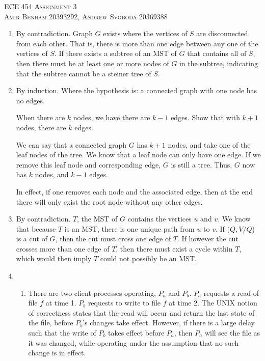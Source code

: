 \documentclass{article}
\begin{document}
\begin{center}
\textsc{\Large ECE 454 Assignment 3}\\[0.5cm]
\textsc{Amir Benham 20393292, Andrew Svoboda 20369388}\\[0.5cm]
\end{center}

\begin{enumerate}

	\item  

By contradiction. Graph \(G\) exists where the vertices of \(S\) are disconnected from each other. That is, there is more than one edge between any one of the vertices of \(S\). If there exists a subtree of an MST of \(G\) that contains all of \(S\), then there must be at least one or more nodes of \(G\) in the subtree, indicating that the subtree cannot be a steiner tree of \(S\).

	\item 
	By induction. Where the hypothesis is: a connected graph with one node has no edges.
	
	When there are \(k\) nodes, we have there are \(k-1\) edges. Show that with \(k+1\) nodes, there are \(k\) edges. 

	We can say that a connected graph \(G\) has \(k+1\) nodes, and take one of the leaf nodes of the tree. We know that a leaf node can only have one edge. If we remove this leaf node and corresponding edge, \(G\) is still a tree. Thus, \(G\) now has \(k\) nodes, and \(k - 1\) edges.

	In effect, if one removes each node and the associated edge, then at the end there will only exist the root node without any other edges. 

	\item 

		By contradiction. \(T\), the MST of \(G\) contains the vertices \(u\) and \(v\). We know that because \(T\) is an MST, there is one unique path from \(u\) to \(v\). If \((Q, V / Q\)) is a cut of \(G\), then the cut must cross one edge of \(T\). If however the cut crosses more than one edge of \(T\), then there must exist a cycle within \(T\), which would then imply \(T\) could not possibly be an MST.


	\item 

	\begin{enumerate}
		\item There are two client processes operating, \(P_a\) and \(P_b\). \(P_a\) requests a read of file \(f\) at time 1.  \(P_b\) requests to write to file \(f\) at time 2. The UNIX notion of correctness states that the read will occur and return the last state of the file, before \(P_b\)'s changes take effect. However, if there is a large delay such that the write of \(P_b\) takes effect before \(P_a\), then \(P_a\) will see the file as it was changed, while operating under the assumption that no such change is in effect.


\end{enumerate}
\end{enumerate}
\end{document}
